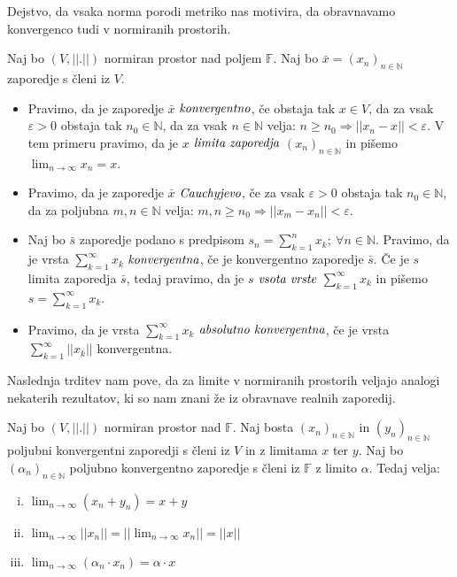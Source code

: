 \documentclass[mat2]{matdelo}
\newcommand{\F}{\mathbb{F}}
\newcommand{\N}{\mathbb{N}}
\newcommand{\abs}[1]{\ensuremath{\lvert #1 \rvert}}
\newcommand{\norm}[1]{\abs{\abs{#1}}}
\newcommand{\pojem}[1]{\ensuremath{\emph{#1}}}
\begin{document}
		Dejstvo, da vsaka norma porodi metriko nas motivira, da obravnavamo konvergenco tudi v normiranih prostorih.
		\begin{definicija}
			\label{def:NormKonv}
			Naj bo $(V, \norm{.})$ normiran prostor nad poljem $\F$. Naj bo $\bar{x} = \left(x_n\right)_{n\in\N}$ zaporedje s členi iz $V$.
			\begin{itemize}
				\item Pravimo, da je zaporedje $\bar{x}$ \pojem{konvergentno}, če obstaja tak $x\in V$, da za vsak $\varepsilon > 0$ obstaja tak $n_0\in \N$, da za vsak $n\in \N$ velja: $n\geq n_0 \Rightarrow \norm{x_n - x} < \varepsilon$. V tem primeru pravimo, da je $x$ \pojem{limita zaporedja} $\left(x_n\right)_{n\in\N}$ in pišemo $\lim_{n\to\infty}x_n = x$.
				\item Pravimo, da je zaporedje $\bar{x}$ \pojem{Cauchyjevo}, če za vsak $\varepsilon >0$ obstaja tak $n_0\in\N$, da za poljubna $m, n \in \N$ velja: $m, n \geq n_0 \Rightarrow \norm{x_m - x_n} < \varepsilon$.
				\item Naj bo $\bar{s}$ zaporedje podano s predpisom $s_n = \sum_{k = 1}^{n}x_k;~\forall n\in\N$. Pravimo, da je vrsta $\sum_{k = 1}^{\infty}x_k$ \pojem{konvergentna}, če je konvergentno zaporedje $\bar{s}$. Če je $s$ limita zaporedja $\bar{s}$, tedaj pravimo, da je $s$ \pojem{vsota vrste} $\sum_{k = 1}^{\infty}x_k$ in pišemo $s = \sum_{k = 1}^{\infty}x_k$.
				\item Pravimo, da je vrsta $\sum_{k = 1}^{\infty}x_k$ \pojem{absolutno konvergentna}, če je vrsta $\sum_{k = 1}^{\infty}\norm{x_k}$ konvergentna.
			\end{itemize} 
		\end{definicija}
		Naslednja trditev nam pove, da za limite v normiranih prostorih veljajo analogi nekaterih rezultatov, ki so nam znani že iz obravnave realnih zaporedij.
		\begin{trditev}
			\label{trd:Normlim}
			Naj bo $(V, \norm{.})$ normiran prostor nad $\F$. Naj bosta $\left(x_n\right)_{n\in\N}$ in $\left(y_n\right)_{n\in\N}$ poljubni konvergentni zaporedji s členi iz $V$ in z limitama $x$ ter $y$. Naj bo $\left(\alpha_n\right)_{n\in\N}$ poljubno konvergentno zaporedje s členi iz $\F$ z limito $\alpha$. Tedaj velja: \begin{enumerate}[i)]
				\item $\lim_{n\to\infty}(x_n + y_n) = x + y$
				\item $\lim_{n\to\infty}\norm{x_n} = \norm{\lim_{n\to\infty}x_n}=\norm{x}$
				\item $\lim_{n\to\infty}(\alpha_n\cdot x_n) = \alpha\cdot x$
			\end{enumerate}
		\end{trditev}
		
\end{document}
